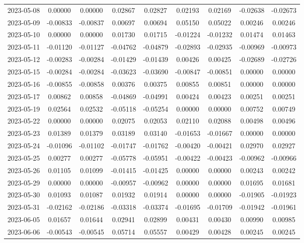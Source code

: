 \begin{footnotesize}
\begin{longtable}{lcccccccc}
2023-05-08 & 0.00000 & 0.00000 & 0.02867 & 0.02827 & 0.02193 & 0.02169 & -0.02638 & -0.02673 \\
2023-05-09 & -0.00833 & -0.00837 & 0.00697 & 0.00694 & 0.05150 & 0.05022 & 0.00246 & 0.00246 \\
2023-05-10 & 0.00000 & 0.00000 & 0.01730 & 0.01715 & -0.01224 & -0.01232 & 0.01474 & 0.01463 \\
2023-05-11 & -0.01120 & -0.01127 & -0.04762 & -0.04879 & -0.02893 & -0.02935 & -0.00969 & -0.00973 \\
2023-05-12 & -0.00283 & -0.00284 & -0.01429 & -0.01439 & 0.00426 & 0.00425 & -0.02689 & -0.02726 \\
2023-05-15 & -0.00284 & -0.00284 & -0.03623 & -0.03690 & -0.00847 & -0.00851 & 0.00000 & 0.00000 \\
2023-05-16 & -0.00855 & -0.00858 & 0.00376 & 0.00375 & 0.00855 & 0.00851 & 0.00000 & 0.00000 \\
2023-05-17 & 0.00862 & 0.00858 & -0.04869 & -0.04991 & 0.00424 & 0.00423 & 0.00251 & 0.00251 \\
2023-05-19 & 0.02564 & 0.02532 & -0.05118 & -0.05254 & 0.00000 & 0.00000 & 0.00752 & 0.00749 \\
2023-05-22 & 0.00000 & 0.00000 & 0.02075 & 0.02053 & 0.02110 & 0.02088 & 0.00498 & 0.00496 \\
2023-05-23 & 0.01389 & 0.01379 & 0.03189 & 0.03140 & -0.01653 & -0.01667 & 0.00000 & 0.00000 \\
2023-05-24 & -0.01096 & -0.01102 & -0.01747 & -0.01762 & -0.00420 & -0.00421 & 0.02970 & 0.02927 \\
2023-05-25 & 0.00277 & 0.00277 & -0.05778 & -0.05951 & -0.00422 & -0.00423 & -0.00962 & -0.00966 \\
2023-05-26 & 0.01105 & 0.01099 & -0.01415 & -0.01425 & 0.00000 & 0.00000 & 0.00243 & 0.00242 \\
2023-05-29 & 0.00000 & 0.00000 & -0.00957 & -0.00962 & 0.00000 & 0.00000 & 0.01695 & 0.01681 \\
2023-05-30 & 0.01093 & 0.01087 & 0.01932 & 0.01914 & 0.00000 & 0.00000 & -0.01905 & -0.01923 \\
2023-05-31 & -0.02162 & -0.02186 & -0.03318 & -0.03374 & -0.01695 & -0.01709 & -0.01942 & -0.01961 \\
2023-06-05 & 0.01657 & 0.01644 & 0.02941 & 0.02899 & 0.00431 & 0.00430 & 0.00990 & 0.00985 \\
2023-06-06 & -0.00543 & -0.00545 & 0.05714 & 0.05557 & 0.00429 & 0.00428 & 0.00245 & 0.00245 \\

\end{longtable}
\end{footnotesize}
